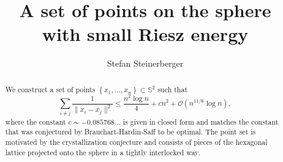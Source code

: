 \documentclass[10pt, reqno]{amsart}
\begin{document}
\title[]{A set of points on the sphere \\with small Riesz energy}


\author[]{Stefan Steinerberger}

 \address{Department of Mathematics and Department of Applied Mathematics, University of Washington, Seattle}


\begin{abstract} 
We construct a set of points $\left\{x_1, \dots, x_n\right\} \subset \mathbb{S}^2$ such that
$$ \sum_{i \neq j} \frac{1}{\|x_i - x_j\|^2} \leq \frac{n^2 \log{n}}{4} + cn^2 + \mathcal{O}(n^{11/6} \log{n}),$$
where the constant $c \sim -0.085768\dots$ is given in closed form and matches the constant that was 
conjectured by Brauchart-Hardin-Saff to be optimal. The point set is motivated by the crystallization conjecture
and consists of pieces of the hexagonal lattice projected onto the sphere in a tightly interlocked way.
\end{abstract}

 

\maketitle

 
\end{document}
